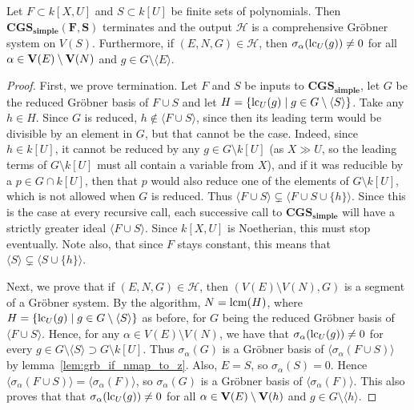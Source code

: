 \begin{theorem}\label{thm:CGS_simple}
  Let $F \subset k[X, U]$ and $S \subset k[U]$ be finite sets of polynomials. Then $\mathbf{CGS_{simple}(F, S)}$ terminates and the output $\mathcal H$ is a comprehensive Gröbner system on $V(S)$. Furthermore, if $(E, N, G) \in \mathcal H$, then $\sigma_{\alpha}(\operatorname{lc}_{U}(g)) \neq 0$ for all $\alpha \in \operatorname{\mathbf V}(E) \setminus \operatorname{\mathbf V}(N)$ and $g \in G \setminus \langle E \rangle$.
\end{theorem}
\begin{proof}
  First, we prove termination. Let $F$ and $S$ be inputs to $\mathbf{CGS_{simple}}$, let $G$ be the reduced Gröbner basis of $F \cup S$ and let $H = \{\operatorname{lc}_{U}(g) \mid g \in G \setminus \langle S \rangle\}$. Take any $h \in H$. Since $G$ is reduced, $h \notin \langle F \cup S \rangle$, since then its leading term would be divisible by an element in $G$, but that cannot be the case. Indeed, since $h \in k[U]$, it cannot be reduced by any $g \in G \setminus k[U]$ (as $X \gg U$, so the leading terms of $G \setminus k[U]$ must all contain a variable from $X$), and if it was reducible by a $p \in G \cap k[U]$, then that $p$ would also reduce one of the elements of $G \setminus k[U]$, which is not allowed when $G$ is reduced. Thus $\langle F \cup S \rangle \subsetneq \langle F \cup S \cup \{h\} \rangle$. Since this is the case at every recursive call, each successive call to $\mathbf{CGS_{simple}}$ will have a strictly greater ideal $\langle F \cup S \rangle$. Since $k[X, U]$ is Noetherian, this must stop eventually. Note also, that since $F$ stays constant, this means that $\langle S \rangle \subsetneq \langle S \cup \{h\} \rangle$.

  Next, we prove that if $(E, N, G) \in \mathcal H$, then $(V(E) \setminus V(N), G)$ is a segment of a Gröbner system. By the algorithm, $N = \operatorname{lcm}(H)$, where $H = \{\operatorname{lc}_{U}(g) \mid g \in G \setminus \langle S \rangle\}$ as before, for $G$ being the reduced Gröbner basis of $\langle F \cup S \rangle$. Hence, for any $\alpha \in V(E) \setminus V(N)$, we have that $\sigma_{\alpha}(\operatorname{lc}_{U}(g)) \neq 0$ for every $g \in G \setminus \langle S \rangle \supset G \setminus k[U]$. Thus $\sigma_{\alpha}(G)$ is a Gröbner basis of $\langle \sigma_{\alpha}(F \cup S) \rangle$ by lemma~\ref{lem:grb_if_nmap_to_z}. Also, $E = S$, so $\sigma_{\alpha}(S) = 0$. Hence $\langle \sigma_{\alpha}(F \cup S) \rangle = \langle \sigma_{\alpha}(F) \rangle$, so $\sigma_{\alpha}(G)$ is a Gröbner basis of $\langle \sigma_{\alpha}(F) \rangle$. This also proves that that $\sigma_{\alpha}(\operatorname{lc}_{U}(g)) \neq 0$ for all $\alpha \in \operatorname{\mathbf V}(E) \setminus \operatorname{\mathbf V}(h)$ and $g \in G \setminus \langle h \rangle$.


\end{proof}
